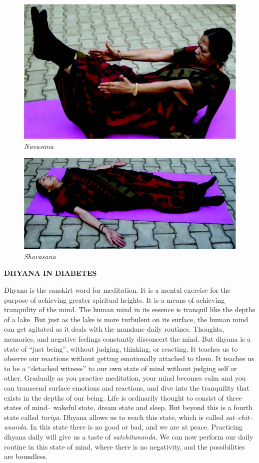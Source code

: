 \begin{figure}
\includegraphics{images/094.jpg}
\caption{\textit{Navasana}}
\end{figure}


\begin{figure}
\includegraphics{images/095.jpg}
\caption{\textit{Shavasana}}
\end{figure}

\textbf{DHYANA IN DIABETES}

Dhyana is the sanskirt word for meditation. It is a mental exercise for the purpose of achieving greater spiritual heights. It is a means of achieving tranquility of the mind. The human mind in its essence is tranquil like the depths of a lake. But just as the lake is more turbulent on its surface, the human mind can get agitated as it deals with the mundane daily routines. Thoughts, memories, and negative feelings constantly disconcert the mind. But dhyana is a state of “just being”, without judging, thinking, or reacting. It teaches us to observe our reactions without getting emotionally attached to them. It teaches us to be a “detached witness” to our own state of mind without judging self or other. Gradually as you practice meditation, your mind becomes calm and you can transcend surface emotions and reactions, and dive into the tranquility that exists in the depths of our being. Life is ordinarily thought to consist of three states of mind– wakeful state, dream state and sleep. But beyond this is a fourth state called \textit{turiya}. Dhyana allows us to reach this state, which is called \textit{sat–chit–ananda}. In this state there is no good or bad, and we are at peace. Practicing dhyana daily will give us a taste of \textit{satchitananda}. We can now perform our daily routine in this state of mind, where there is no negativity, and the possibilities are boundless.

